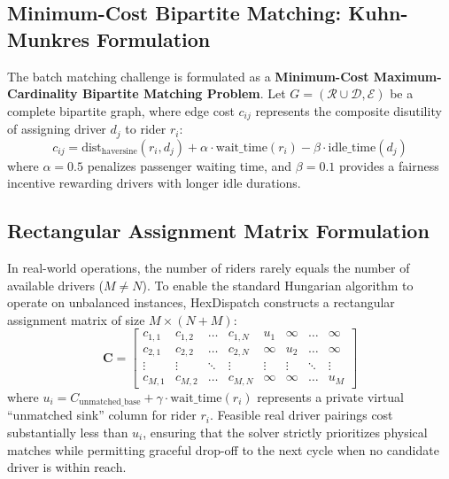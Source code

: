 \documentclass[11pt,a4paper]{article}
\begin{document}
\subsection{Minimum-Cost Bipartite Matching: Kuhn-Munkres Formulation}
The batch matching challenge is formulated as a \textbf{Minimum-Cost Maximum-Cardinality Bipartite Matching Problem}. Let $G = (\mathcal{R} \cup \mathcal{D}, \mathcal{E})$ be a complete bipartite graph, where edge cost $c_{ij}$ represents the composite disutility of assigning driver $d_j$ to rider $r_i$:
\begin{equation}
    c_{ij} = \text{dist}_{\text{haversine}}(r_i, d_j) + \alpha \cdot \text{wait\_time}(r_i) - \beta \cdot \text{idle\_time}(d_j)
\end{equation}
where $\alpha = 0.5$ penalizes passenger waiting time, and $\beta = 0.1$ provides a fairness incentive rewarding drivers with longer idle durations.

\subsection{Rectangular Assignment Matrix Formulation}
In real-world operations, the number of riders rarely equals the number of available drivers ($M \neq N$). To enable the standard Hungarian algorithm to operate on unbalanced instances, HexDispatch constructs a rectangular assignment matrix of size $M \times (N + M)$:
\begin{equation}
    \mathbf{C} = \begin{bmatrix}
        c_{1,1} & c_{1,2} & \dots & c_{1,N} & u_1 & \infty & \dots & \infty \\
        c_{2,1} & c_{2,2} & \dots & c_{2,N} & \infty & u_2 & \dots & \infty \\
        \vdots & \vdots & \ddots & \vdots & \vdots & \vdots & \ddots & \vdots \\
        c_{M,1} & c_{M,2} & \dots & c_{M,N} & \infty & \infty & \dots & u_M
    \end{bmatrix}
\end{equation}
where $u_i = C_{\text{unmatched\_base}} + \gamma \cdot \text{wait\_time}(r_i)$ represents a private virtual ``unmatched sink'' column for rider $r_i$. Feasible real driver pairings cost substantially less than $u_i$, ensuring that the solver strictly prioritizes physical matches while permitting graceful drop-off to the next cycle when no candidate driver is within reach.
\end{document}
